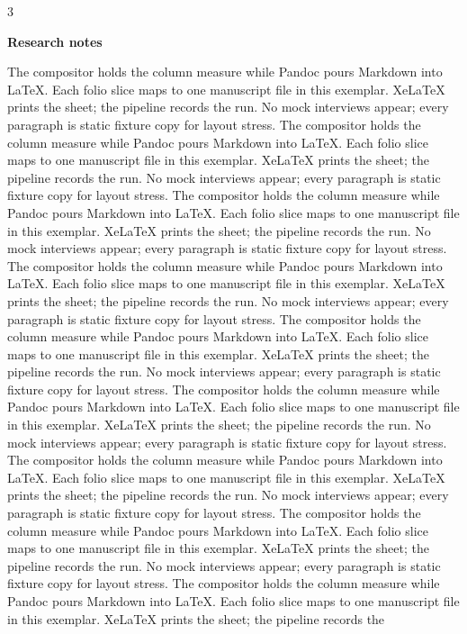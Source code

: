 \documentclass[
]{article}
\begin{document}
\begin{multicols}{3}

\textbf{Research notes}

The compositor holds the column measure while Pandoc pours Markdown into
LaTeX. Each folio slice maps to one manuscript file in this exemplar.
XeLaTeX prints the sheet; the pipeline records the run. No mock
interviews appear; every paragraph is static fixture copy for layout
stress. The compositor holds the column measure while Pandoc pours
Markdown into LaTeX. Each folio slice maps to one manuscript file in
this exemplar. XeLaTeX prints the sheet; the pipeline records the run.
No mock interviews appear; every paragraph is static fixture copy for
layout stress. The compositor holds the column measure while Pandoc
pours Markdown into LaTeX. Each folio slice maps to one manuscript file
in this exemplar. XeLaTeX prints the sheet; the pipeline records the
run. No mock interviews appear; every paragraph is static fixture copy
for layout stress. The compositor holds the column measure while Pandoc
pours Markdown into LaTeX. Each folio slice maps to one manuscript file
in this exemplar. XeLaTeX prints the sheet; the pipeline records the
run. No mock interviews appear; every paragraph is static fixture copy
for layout stress. The compositor holds the column measure while Pandoc
pours Markdown into LaTeX. Each folio slice maps to one manuscript file
in this exemplar. XeLaTeX prints the sheet; the pipeline records the
run. No mock interviews appear; every paragraph is static fixture copy
for layout stress. The compositor holds the column measure while Pandoc
pours Markdown into LaTeX. Each folio slice maps to one manuscript file
in this exemplar. XeLaTeX prints the sheet; the pipeline records the
run. No mock interviews appear; every paragraph is static fixture copy
for layout stress. The compositor holds the column measure while Pandoc
pours Markdown into LaTeX. Each folio slice maps to one manuscript file
in this exemplar. XeLaTeX prints the sheet; the pipeline records the
run. No mock interviews appear; every paragraph is static fixture copy
for layout stress. The compositor holds the column measure while Pandoc
pours Markdown into LaTeX. Each folio slice maps to one manuscript file
in this exemplar. XeLaTeX prints the sheet; the pipeline records the
run. No mock interviews appear; every paragraph is static fixture copy
for layout stress. The compositor holds the column measure while Pandoc
pours Markdown into LaTeX. Each folio slice maps to one manuscript file
in this exemplar. XeLaTeX prints the sheet; the pipeline records the

\end{multicols}
\end{document}
